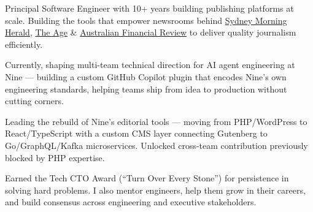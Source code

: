 

\begin{cvparagraph}
Principal Software Engineer with 10+ years building publishing platforms at scale.
Building the tools that empower newsrooms behind
\href{https://www.smh.com.au/}{\color{awesome}Sydney Morning Herald},
\href{https://www.theage.com.au/}{\color{awesome}The Age} \&
\href{https://www.afr.com/}{\color{awesome}Australian Financial Review}
to deliver quality journalism efficiently.

Currently, shaping multi-team technical direction for AI agent engineering at
Nine --- building a custom GitHub Copilot plugin that encodes Nine's own engineering
standards, helping teams ship from idea to production without cutting corners.

Leading the rebuild of Nine's editorial tools --- moving from PHP/WordPress to
React/TypeScript with a custom CMS layer connecting Gutenberg to Go/GraphQL/Kafka
microservices. Unlocked cross-team contribution previously blocked by PHP expertise.

Earned the Tech CTO Award (``Turn Over Every Stone'') for persistence in solving hard
problems. I also mentor engineers, help them grow in their careers, and build consensus
across engineering and executive stakeholders.
\end{cvparagraph}
